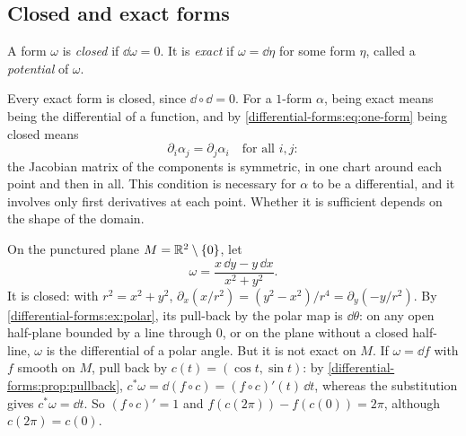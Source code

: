 \begin{notechapter}
\section{Closed and exact forms}\label{differential-forms:sec:closed}

\begin{definition}\label{differential-forms:def:closed}
A form $\omega$ is \emph{closed} if $\dd\omega = 0$. It is \emph{exact}
if $\omega = \dd\eta$ for some form $\eta$, called a \emph{potential} of
$\omega$.
\end{definition}

Every exact form is closed, since $\dd\circ\dd = 0$. For a $1$-form
$\alpha$, being exact means being the differential of a function, and
by \eqref{differential-forms:eq:one-form} being closed means
\[
  \partial_i\alpha_j = \partial_j\alpha_i\quad\text{for all }i, j :
\]
the Jacobian matrix of the components is symmetric, in one chart around
each point and then in all. This condition is necessary for $\alpha$ to
be a differential, and it involves only first derivatives at each
point. Whether it is sufficient depends on the shape of the domain.

\begin{example}\label{differential-forms:ex:angle}
On the punctured plane $M = \mathbb{R}^2\setminus\{0\}$, let
\[
  \omega = \frac{x\,\dd y - y\,\dd x}{x^2 + y^2} .
\]
It is closed: with $r^2 = x^2 + y^2$,
$\partial_x(x/r^2) = (y^2 - x^2)/r^4 = \partial_y(-y/r^2)$. By
\cref{differential-forms:ex:polar}, its pull-back by the polar map is
$\dd\theta$: on any open half-plane bounded by a line through $0$, or on
the plane without a closed half-line, $\omega$ is the differential of a
polar angle. But it is not exact on $M$. If $\omega = \dd f$ with $f$
smooth on $M$, pull back by $c(t) = (\cos t, \sin t)$: by
\cref{differential-forms:prop:pullback},
$c^*\omega = \dd(f\circ c) = (f\circ c)'(t)\,\dd t$, whereas the
substitution gives $c^*\omega = \dd t$. So $(f\circ c)' = 1$ and
$f(c(2\pi)) - f(c(0)) = 2\pi$, although $c(2\pi) = c(0)$.
\end{example}


\end{notechapter}
